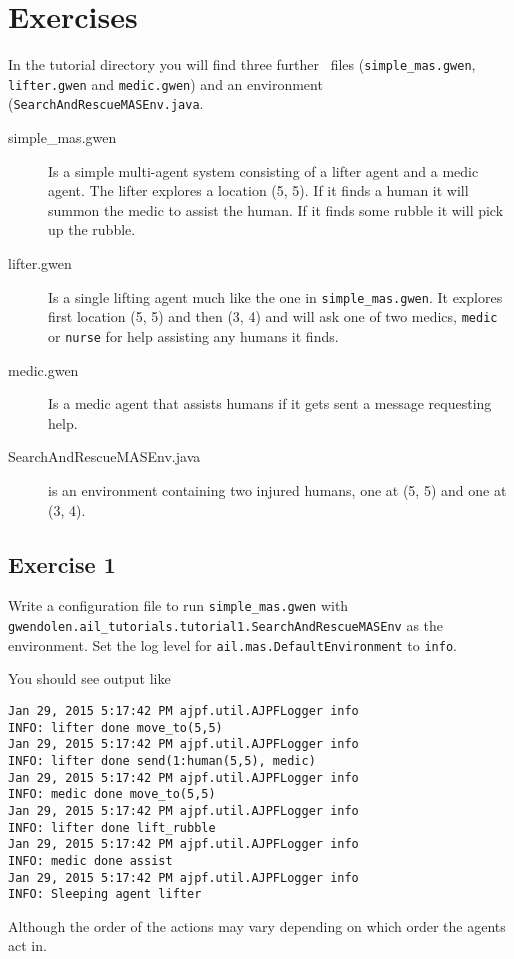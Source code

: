 \section{Exercises}
In the tutorial directory you will find three further \gwendolen\ files (\texttt{simple\_mas.gwen}, \texttt{lifter.gwen} and \texttt{medic.gwen}) and an environment (\texttt{SearchAndRescueMASEnv.java}.
\begin{description}
\item[simple\_mas.gwen] Is a simple multi-agent system consisting of a lifter agent and a medic agent.  The lifter explores a location (5, 5).  If it finds a human it will summon the medic to assist the human.  If it finds some rubble it will pick up the rubble.
\item[lifter.gwen]Is a single lifting agent much like the one in \texttt{simple\_mas.gwen}.  It explores first location (5, 5) and then (3, 4) and will ask one of two medics, \texttt{medic} or \texttt{nurse} for help assisting any humans it finds.
\item[medic.gwen]Is a medic agent that assists humans if it gets sent a message requesting help.
\item[SearchAndRescueMASEnv.java] is an environment containing two injured humans, one at (5, 5) and one at (3, 4).
\end{description}

\subsection{Exercise 1}
\begin{sloppypar}
Write a configuration file to run \texttt{simple\_mas.gwen} with \texttt{gwendolen.ail\_tutorials.tutorial1.SearchAndRescueMASEnv} as the environment.  Set the log level for \texttt{ail.mas.DefaultEnvironment} to \texttt{info}.
\end{sloppypar}

You should see output like
\begin{verbatim}
Jan 29, 2015 5:17:42 PM ajpf.util.AJPFLogger info
INFO: lifter done move_to(5,5)
Jan 29, 2015 5:17:42 PM ajpf.util.AJPFLogger info
INFO: lifter done send(1:human(5,5), medic)
Jan 29, 2015 5:17:42 PM ajpf.util.AJPFLogger info
INFO: medic done move_to(5,5)
Jan 29, 2015 5:17:42 PM ajpf.util.AJPFLogger info
INFO: lifter done lift_rubble
Jan 29, 2015 5:17:42 PM ajpf.util.AJPFLogger info
INFO: medic done assist
Jan 29, 2015 5:17:42 PM ajpf.util.AJPFLogger info
INFO: Sleeping agent lifter
\end{verbatim}
Although the order of the actions may vary depending on which order the agents act in.

